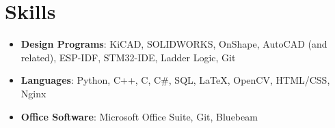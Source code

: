 \documentclass[letterpaper,11pt]{article}
\newcommand{\resumeItem}[2]{
  \item\small{
    \textbf{#1}{: #2 \vspace{-2pt}}
  }
}
\newcommand{\resumeSubItem}[2]{\resumeItem{#1}{#2}\vspace{-4pt}}
\newcommand{\resumeSubHeadingListStart}{\begin{itemize}[leftmargin=*]}
\newcommand{\resumeSubHeadingListEnd}{\end{itemize}}
\begin{document}
\section{Skills}
 \resumeSubHeadingListStart
   \resumeSubItem{Design Programs}{KiCAD, SOLIDWORKS, OnShape, AutoCAD (and related), ESP-IDF, STM32-IDE, Ladder Logic, Git}
   \resumeSubItem{Languages}{Python, C++, C, C\#, SQL, \LaTeX, OpenCV, HTML/CSS, Nginx}
   \resumeSubItem{Office Software}{Microsoft Office Suite, Git, Bluebeam}
 \resumeSubHeadingListEnd




\end{document}
